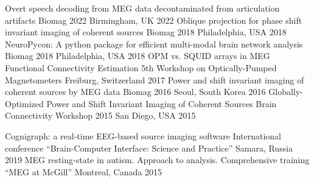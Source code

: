 \begin{cventries}
    \cvconf
    {Overt speech decoding from MEG data decontaminated from articulation artifacts}
    {Biomag 2022}
    {Birmingham, UK}
    {2022}
    \cvconf
    {Oblique projection for phase shift invariant imaging of coherent sources}
    {Biomag 2018}
    {Philadelphia, USA}
    {2018}
    \cvconf
    {NeuroPycon: A python package for efficient multi-modal brain network analysis}
    {Biomag 2018}
    {Philadelphia, USA}
    {2018}
    \cvconf
    {OPM vs. SQUID arrays in MEG Functional Connectivity Estimation}
    {5th Workshop on Optically-Pumped Magnetometers}
    {Freiburg, Switzerland}
    {2017}
    \cvconf
    {Power and shift invariant imaging of coherent sources by MEG data}
    {Biomag 2016}
    {Seoul, South Korea}
    {2016}
    \cvconf
    {Globally-Optimized Power and Shift Invariant Imaging of Coherent Sources}
    {Brain Connectivity Workshop 2015}
    {San Diego, USA}
    {2015}
\end{cventries}
\begin{cventries}
  \cvconf
    {Cognigraph: a real-time EEG-based source imaging software}
    {International conference ``Brain-Computer Interface: Science and Practice''}
    {Samara, Russia}
    {2019}
  \cvconf
    {MEG resting-state in autism. Approach to analysis.}
    {Comprehensive training ``MEG at McGill''}
    {Montreal, Canada}
    {2015}
\end{cventries}
